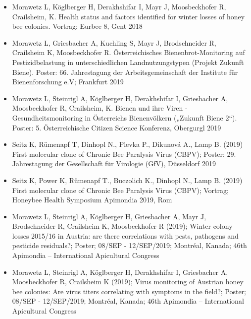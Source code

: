 \begin{itemize}

    \item 
    Morawetz L, Köglberger H, Derakhshifar I, Mayr J, Moosbeckhofer R, Crailsheim, K. Health status and factors identified for winter losses of honey bee colonies. Vortrag: Eurbee 8, Gent 2018
    
    \item 
    Morawetz L, Griesbacher A, Kuchling S, Mayr J, Brodschneider R, Crailsheim K, Moosbeckhofer R. Österreichisches Bienenbrot-Monitoring auf Pestizidbelastung in unterschiedlichen Landnutzungstypen (Projekt Zukunft Biene). Poster: 66. Jahrestagung der Arbeitsgemeinschaft der Institute für Bienenforschung e.V; Frankfurt 2019

    \item 
    Morawetz L, Steinrigl A, Köglberger H, Derakhshifar I, Griesbacher A, Moosbeckhofer R, Crailsheim, K. Bienen und ihre Viren - Gesundheitsmonitoring in Österreichs Bienenvölkern („Zukunft Biene 2“). Poster: 5. Österreichische Citizen Science Konferenz, Obergurgl 2019

    \item 
    Seitz K, Rümenapf T, Dinhopl N., Plevka P., Dikunová A., Lamp B. (2019) First molecular clone of Chronic Bee Paralysis Virus (CBPV); Poster: 29. Jahrestagung der Gesellschaft für Virologie (GfV), Düsseldorf 2019

    \item 
    Seitz K, Power K, Rümenapf T., Buczolich K., Dinhopl N., Lamp B. (2019) First molecular clone of Chronic Bee Paralysis Virus (CBPV); Vortrag; Honeybee Health Symposium Apimondia 2019, Rom
    
    \item
    Morawetz L, Steinrigl A, Köglberger H, Griesbacher A, Mayr J, Brodschneider R, Crailsheim K, Moosbeckhofer R (2019); Winter colony losses 2015/16 in Austria: are there correlations with pests, pathogens and pesticide residuals?; Poster; 08/SEP - 12/SEP/2019; Montréal, Kanada; 46th Apimondia – International Apicultural Congress
    
    \item
    Morawetz L, Steinrigl A, Köglberger H, Derakhshifar I, Griesbacher A, Moosbeckhofer R, Crailsheim K (2019); Virus monitoring of Austrian honey bee colonies: Are virus titers correlating with symptoms in the field?; Poster; 08/SEP - 12/SEP/2019; Montréal, Kanada; 46th Apimondia – International Apicultural Congress

\end{itemize}


